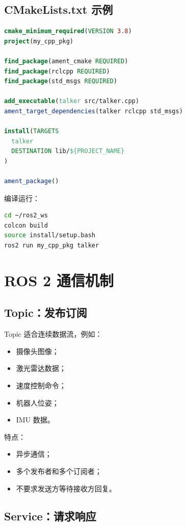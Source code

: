 \documentclass[UTF8,a4paper,12pt]{ctexart}
\begin{document}
\subsection{CMakeLists.txt 示例}

\begin{lstlisting}[language=Cmake]
cmake_minimum_required(VERSION 3.8)
project(my_cpp_pkg)

find_package(ament_cmake REQUIRED)
find_package(rclcpp REQUIRED)
find_package(std_msgs REQUIRED)

add_executable(talker src/talker.cpp)
ament_target_dependencies(talker rclcpp std_msgs)

install(TARGETS
  talker
  DESTINATION lib/${PROJECT_NAME}
)

ament_package()
\end{lstlisting}

编译运行：

\begin{lstlisting}[language=bash]
cd ~/ros2_ws
colcon build
source install/setup.bash
ros2 run my_cpp_pkg talker
\end{lstlisting}

\section{ROS 2 通信机制}

\subsection{Topic：发布订阅}

Topic 适合连续数据流，例如：
\begin{itemize}
    \item 摄像头图像；
    \item 激光雷达数据；
    \item 速度控制命令；
    \item 机器人位姿；
    \item IMU 数据。
\end{itemize}

特点：
\begin{itemize}
    \item 异步通信；
    \item 多个发布者和多个订阅者；
    \item 不要求发送方等待接收方回复。
\end{itemize}

\subsection{Service：请求响应}
\end{document}
